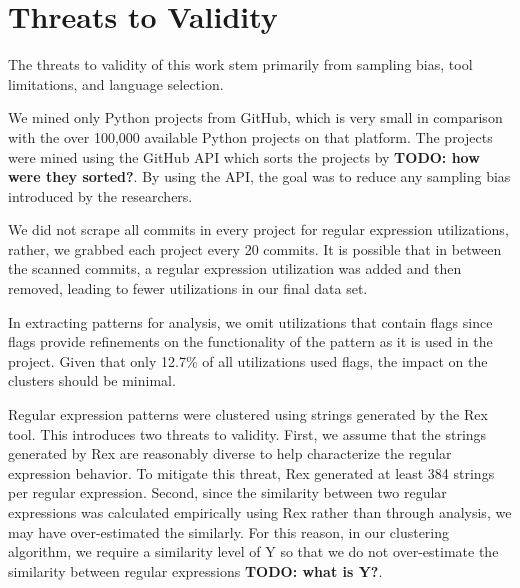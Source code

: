 \documentclass[conference]{IEEEtran}
\newcommand{\todo}[1]{\textbf{TODO: #1}}
\begin{document}










\section{Threats to Validity}

The threats to validity of this work stem primarily from sampling bias, tool limitations, and language selection.

We mined only  Python projects from GitHub, which is very small in comparison with the over 100,000 available Python projects on that platform. The projects were mined using the GitHub API which sorts the projects by \todo{how were they sorted?}. By using the API, the goal was to reduce any sampling bias introduced by the researchers.

We did not scrape all commits in every project for regular expression utilizations, rather, we grabbed each project every 20 commits. It is possible that in between the scanned commits, a regular expression utilization was added and then removed, leading to fewer utilizations in our final data set.

In extracting patterns for analysis, we omit utilizations that contain flags since flags provide refinements on the functionality of the pattern as it is used in the project. Given that only 12.7\% of all utilizations used flags, the impact on the clusters should be minimal.


Regular expression patterns were clustered using strings generated by the Rex tool. This introduces two threats to validity. First, we assume that the strings generated by Rex are reasonably diverse to help characterize the regular expression behavior. To mitigate this threat, Rex generated at least 384 strings per regular expression. Second, since the similarity between two regular expressions was calculated empirically using Rex rather than through analysis, we may have over-estimated the similarly. For this reason, in our clustering algorithm, we require a similarity level of Y so that we do not over-estimate the similarity between regular  expressions \todo{what is Y?}.
\end{document}
